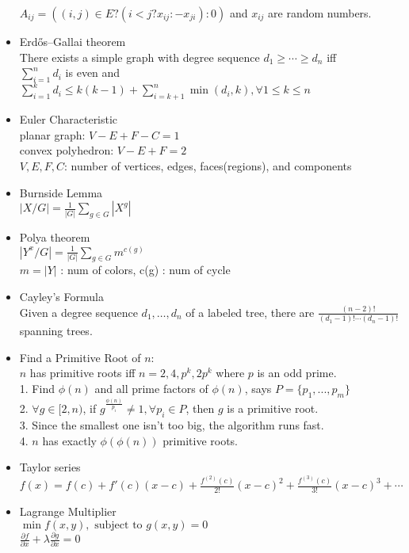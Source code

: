 \begin{itemize}
    $A_{ij}=((i,j)\in E ? (i < j ? x_{ij} : -x_{ji}) : 0)$ and $x_{ij}$ are random numbers.
  \item Erdős–Gallai theorem\\
    There exists a simple graph with degree sequence $d_1\ge\cdots\ge d_n$ iff\\
    $\sum\limits_{i=1}^{n} d_i$ is even and $\sum\limits_{i=1}^{k} d_i\le k(k-1)+\sum\limits_{i=k+1}^{n} \min(d_i,k), \forall 1\le k\le n$
  \item Euler Characteristic\\
    planar graph: $V-E+F-C=1$ \\
    convex polyhedron: $V-E+F=2$ \\
    $V,E,F,C$: number of vertices, edges, faces(regions), and components
  \item Burnside Lemma\\
    $|X/G|=\frac{1}{|G|}\sum\limits_{g \in G} {|X^g|}$
  \item Polya theorem\\
    $|Y^x/G|=\frac{1}{|G|}\sum\limits_{g \in G} {m^{c(g)}}$\\
    $m = |Y|$ : num of colors, c(g) : num of cycle
  \item Cayley's Formula\\
    Given a degree sequence $d_1,\dots,d_n$ of a labeled tree, there are $\frac{(n-2)!}{(d_1-1)!\cdots(d_n-1)!}$ spanning trees.
  \item Find a Primitive Root of $n$:\\
    $n$ has primitive roots iff $n=2,4,p^k,2p^k$ where $p$ is an odd prime.\\
    1. Find $\phi(n)$ and all prime factors of $\phi(n)$, says $P=\{p_1,...,p_m\}$\\
    2. $\forall g\in[2,n)$, if $g^{\frac{\phi(n)}{p_i}}\ne 1,\forall p_i\in P$, then $g$ is a primitive root.\\
    3. Since the smallest one isn't too big, the algorithm runs fast.\\
    4. $n$ has exactly $\phi(\phi(n))$ primitive roots.
  \item Taylor series\\
    $f(x) = f(c) + f'(c)(x-c) + \frac{f^{(2)}(c)}{2!}(x-c)^2 + \frac{f^{(3)}(c)}{3!}(x-c)^3 + \cdots$
  \item Lagrange Multiplier\\
    $\min f(x, y), \mbox{ subject to } g(x, y) = 0$\\
    $\frac{\partial f}{\partial x} + \lambda\frac{\partial g}{\partial x}=0$\\

\end{itemize}
